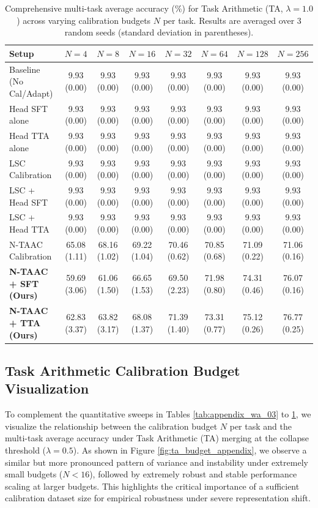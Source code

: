 \documentclass{article}
\theoremstyle{plain}
\theoremstyle{definition}
\theoremstyle{remark}
\begin{document}
\begin{table}[ht]
\centering
\caption{Comprehensive multi-task average accuracy (\%) for Task Arithmetic (TA, $\lambda=1.0$) across varying calibration budgets $N$ per task. Results are averaged over 3 random seeds (standard deviation in parentheses).}
\label{tab:appendix_ta_10}
\vskip 0.15in
\begin{sc}
\begin{scriptsize}
\setlength{\tabcolsep}{3pt}
\begin{tabular}{lccccccc}
\toprule
Setup & $N=4$ & $N=8$ & $N=16$ & $N=32$ & $N=64$ & $N=128$ & $N=256$ \\
\midrule
Baseline (No Cal/Adapt) & 9.93 (0.00) & 9.93 (0.00) & 9.93 (0.00) & 9.93 (0.00) & 9.93 (0.00) & 9.93 (0.00) & 9.93 (0.00) \\
Head SFT alone & 9.93 (0.00) & 9.93 (0.00) & 9.93 (0.00) & 9.93 (0.00) & 9.93 (0.00) & 9.93 (0.00) & 9.93 (0.00) \\
Head TTA alone & 9.93 (0.00) & 9.93 (0.00) & 9.93 (0.00) & 9.93 (0.00) & 9.93 (0.00) & 9.93 (0.00) & 9.93 (0.00) \\
LSC Calibration & 9.93 (0.00) & 9.93 (0.00) & 9.93 (0.00) & 9.93 (0.00) & 9.93 (0.00) & 9.93 (0.00) & 9.93 (0.00) \\
LSC + Head SFT & 9.93 (0.00) & 9.93 (0.00) & 9.93 (0.00) & 9.93 (0.00) & 9.93 (0.00) & 9.93 (0.00) & 9.93 (0.00) \\
LSC + Head TTA & 9.93 (0.00) & 9.93 (0.00) & 9.93 (0.00) & 9.93 (0.00) & 9.93 (0.00) & 9.93 (0.00) & 9.93 (0.00) \\
N-TAAC Calibration & 65.08 (1.11) & 68.16 (1.02) & 69.22 (1.04) & 70.46 (0.62) & 70.85 (0.68) & 71.09 (0.22) & 71.06 (0.16) \\
\textbf{N-TAAC + SFT (Ours)} & 59.69 (3.06) & 61.06 (1.50) & 66.65 (1.53) & 69.50 (2.23) & 71.98 (0.80) & 74.31 (0.46) & 76.07 (0.16) \\
\textbf{N-TAAC + TTA (Ours)} & 62.83 (3.37) & 63.82 (3.17) & 68.08 (1.37) & 71.39 (1.40) & 73.31 (0.77) & 75.12 (0.26) & 76.77 (0.25) \\
\bottomrule
\end{tabular}
\end{scriptsize}
\end{sc}
\end{table}

\subsection{Task Arithmetic Calibration Budget Visualization}
To complement the quantitative sweeps in Tables \ref{tab:appendix_wa_03} to \ref{tab:appendix_ta_10}, we visualize the relationship between the calibration budget $N$ per task and the multi-task average accuracy under Task Arithmetic (TA) merging at the collapse threshold ($\lambda=0.5$). As shown in Figure \ref{fig:ta_budget_appendix}, we observe a similar but more pronounced pattern of variance and instability under extremely small budgets ($N < 16$), followed by extremely robust and stable performance scaling at larger budgets. This highlights the critical importance of a sufficient calibration dataset size for empirical robustness under severe representation shift.
\end{document}
